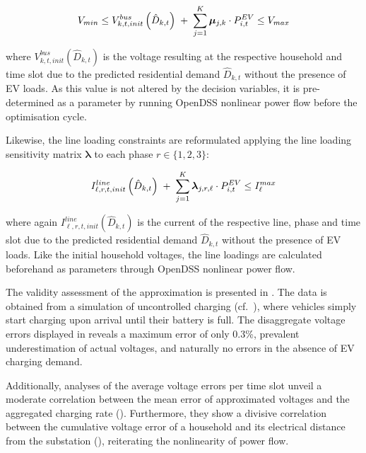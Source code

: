 \begin{equation}
V_{min} \leq V^{bus}_{k,t,init}\left(\hat{D}_{k,t}\right) \;+\; \sum_{j=1}^{K} \bm{\mu}_{j,k} \cdot P^{EV}_{i,t} \leq V_{max}
\end{equation}

where $V^{bus}_{k,t,init}\left(\hat{D}_{k,t}\right)$ is the voltage resulting at the respective household and time slot due to the predicted residential demand $\hat{D}_{k,t}$ without the presence of EV loads. As this value is not altered by the decision variables, it is pre-determined as a parameter by running OpenDSS nonlinear power flow before the optimisation cycle.

Likewise, the line loading constraints are reformulated applying the line loading sensitivity matrix $\bm{\lambda}$ to each phase $r\in \{1,2,3\}$:

\begin{equation}
I_{\ell,r,t,init}^{line}\left(\hat{D}_{k,t}\right)  \;+\; \sum_{j=1}^{K} \bm{\lambda}_{j,r,\ell} \cdot P^{EV}_{i,t} \leq I_{\ell}^{max}
\end{equation}

where again $I_{\ell,r,t,init}^{line}\left(\hat{D}_{k,t}\right)$ is the current of the respective line, phase and time slot due to the predicted residential demand $\hat{D}_{k,t}$ without the presence of EV loads. Like the initial household voltages, the line loadings are calculated beforehand as parameters through OpenDSS nonlinear power flow.


The validity assessment of the approximation is presented in . The data is obtained from a simulation of uncontrolled charging (cf.\ ), where vehicles simply start charging upon arrival until their battery is full. The disaggregate voltage errors displayed in  reveals a maximum error of only 0.3\%, prevalent underestimation of actual voltages, and naturally no errors in the absence of EV charging demand.

Additionally, analyses of the average voltage errors per time slot unveil a moderate correlation between the mean error of approximated voltages and the aggregated charging rate (). Furthermore, they show a divisive correlation between the cumulative voltage error of a household and its electrical distance from the substation (), reiterating the nonlinearity of power flow.

